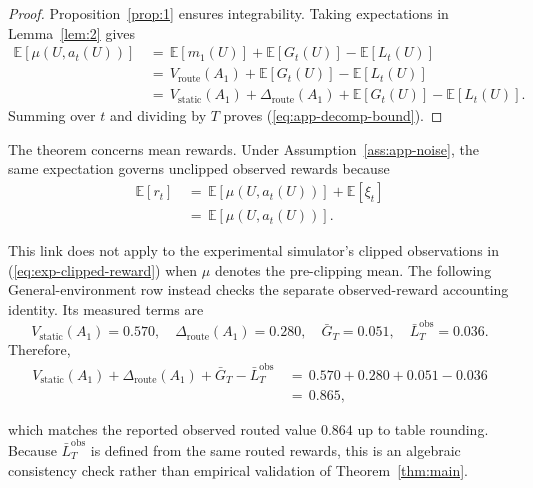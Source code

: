 \documentclass{article} %
\renewcommand{\eqref}[1]{\textup{(\ref{#1})}}
\begin{document}
\begin{proof}
Proposition~\ref{prop:1} ensures integrability.  Taking expectations in
Lemma~\ref{lem:2} gives
\begin{equation}
\begin{aligned}
\mathbb{E}[\mu(U,a_t(U))]
&\,=\,
  \mathbb E[m_1(U)]+\mathbb E[G_t(U)]-\mathbb E[L_t(U)] \\
&\,=\,
  V_{\mathrm{route}}(A_1)+\mathbb E[G_t(U)]-\mathbb E[L_t(U)] \\
&\,=\,
V_{\mathrm{static}}(A_1)
+
\Delta_{\mathrm{route}}(A_1)
+
\mathbb E[G_t(U)]
-
\mathbb E[L_t(U)].
\end{aligned}
\end{equation}
Summing over \(t\) and dividing by \(T\) proves
\eqref{eq:app-decomp-bound}.
\end{proof}

The theorem concerns mean rewards.  Under Assumption~\ref{ass:app-noise}, the
same expectation governs unclipped observed rewards because
\begin{equation}
\label{eq:app-observed-mean-link}
\begin{aligned}
\mathbb{E}[r_t]
&\,=\,\mathbb E[\mu(U,a_t(U))]+\mathbb E[\xi_t] \\
&\,=\,
\mathbb{E}[\mu(U,a_t(U))].
\end{aligned}
\end{equation}

This link does not apply to the experimental simulator's clipped observations in
\eqref{eq:exp-clipped-reward} when \(\mu\) denotes the pre-clipping mean.
The following General-environment row instead checks the separate observed-reward
accounting identity.  Its measured terms are
\begin{equation}
V_{\mathrm{static}}(A_1)=0.570,\quad
\Delta_{\mathrm{route}}(A_1)=0.280,\quad
\bar G_T=0.051,\quad
\bar L_T^{\mathrm{obs}}=0.036.
\end{equation}
Therefore,
\begin{equation}
\label{eq:app-numeric-closure}
\begin{aligned}
V_{\mathrm{static}}(A_1)
+
\Delta_{\mathrm{route}}(A_1)
+
\bar G_T
-
\bar L_T^{\mathrm{obs}}
&\,=\,
0.570+0.280+0.051-0.036
\\
&\,=\,
0.865,
\end{aligned}
\end{equation}

which matches the reported observed routed value \(0.864\) up to table
rounding. Because \(\bar L_T^{\mathrm{obs}}\) is defined from the same routed
rewards, this is an algebraic consistency check rather than empirical
validation of Theorem~\ref{thm:main}.
\end{document}
